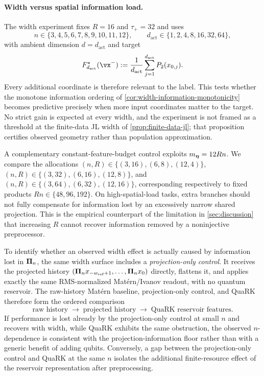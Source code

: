 \paragraph{Width versus spatial information load.}
The width experiment fixes $R=16$ and $\tau_+=32$ and uses
\begin{equation}
    n\in\{3,4,5,6,7,8,9,10,11,12\},
    \qquad
    d_{\mathrm{act}}\in\{1,2,4,8,16,32,64\},
    \label{eq:n-d-grid}
\end{equation}
with ambient dimension $d=d_{\mathrm{act}}$ and target
\begin{equation}
    F_{d_{\mathrm{act}}}^\star(\vx^-)
    :=\frac1{d_{\mathrm{act}}}
      \sum_{j=1}^{d_{\mathrm{act}}}P_2(x_{0,j}).
    \label{eq:spatial-load-task}
\end{equation}
Every additional coordinate is therefore relevant to the label.  This tests whether the monotone information ordering of
\cref{cor:width-information-monotonicity} becomes predictive precisely when more
input coordinates matter to the target.  No strict gain is expected at every
width, and the experiment is not framed as a threshold at the finite-data JL
width of \cref{prop:finite-data-jl}; that proposition certifies observed
geometry rather than population approximation.

A complementary constant-feature-budget control exploits
$m_{\bm{\eta}}=12Rn$.  We compare the allocations
$(n,R)\in\{(3,16),(6,8),(12,4)\}$,
$(n,R)\in\{(3,32),(6,16),(12,8)\}$, and
$(n,R)\in\{(3,64),(6,32),(12,16)\}$, corresponding respectively to fixed
products $Rn\in\{48,96,192\}$.  On high-spatial-load tasks, extra branches
should not fully compensate for information lost by an excessively narrow
shared projection.  This is the empirical counterpart of the limitation in
\cref{sec:discussion} that increasing $R$ cannot recover information removed
by a noninjective preprocessor.

To identify whether an observed width effect is actually caused by information
lost in $\bm{\Pi}_n$, the same width surface includes a
\emph{projection-only control}.  It receives the projected history
$(\bm{\Pi}_n x_{-w_{\mathrm{ref}}+1},\ldots,\bm{\Pi}_n x_0)$ directly,
flattens it, and applies exactly the same RMS-normalized Mat\'ern/Ivanov
readout, with no quantum reservoir.  The raw-history Mat\'ern baseline,
projection-only control, and QuaRK therefore form the ordered comparison
\[
    \text{raw history}
    \;\longrightarrow\;
    \text{projected history}
    \;\longrightarrow\;
    \text{QuaRK reservoir features}.
\]
If performance is lost already by the projection-only control at small $n$ and
recovers with width, while QuaRK exhibits the same obstruction, the observed
$n$-dependence is consistent with the projection-information floor rather than
with a generic benefit of adding qubits.  Conversely, a gap between the
projection-only control and QuaRK at the same $n$ isolates the additional
finite-resource effect of the reservoir representation after preprocessing.

